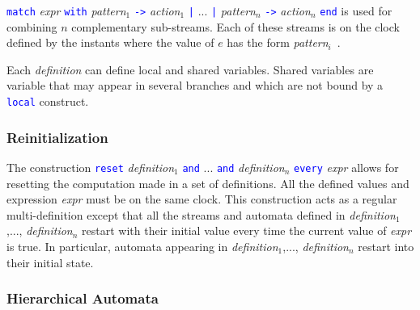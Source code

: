 \documentclass[11pt,titlepage,twoside]{report}
\newcommand{\And}{\mbox{{\tt and}}}
\renewcommand{\Reset}{\mbox{{\tt reset}}}
\newcommand{\Every}{\mbox{{\tt every}}}
\newcommand{\term}[1]{\textcolor{Blue}{\tt #1}}
\newcommand{\nterm}[1]{\textcolor{BrickRed}{\it #1}}
\newcommand{\term}[1]{{\tt #1}}
\newcommand{\nterm}[1]{{\em #1}}
\begin{document}
\term{match} \nterm{expr} \term{with} \nterm{pattern}$_1$ \term{->}
\nterm{action}$_1$ \term{|} ... \term{|} \nterm{pattern}$_n$ \term{->}
\nterm{action}$_n$ \term{end} is used for combining $n$ complementary
sub-streams. Each of these streams is on the clock defined by the
instants where the value of $e$ has the form \nterm{pattern}$_i$\ .

Each \nterm{definition} can define local and shared variables.
Shared variables are variable that may appear in several branches and
which are not bound by a \term{local} construct.

\subsubsection{Reinitialization}

The construction \term{\Reset} \nterm{definition}$_1$ \term{\And} ...
\term{\And} \nterm{definition}$_n$ \term{\Every} \nterm{expr} allows
for resetting the computation made in a set of definitions. All the
defined values and expression \nterm{expr} must be on the same
clock. This construction acts as a regular multi-definition except
that all the streams and automata defined in
\nterm{definition}$_1$,..., \nterm{definition}$_n$ restart with their
initial value every time the current value of {\em expr} is true. In
particular, automata appearing in \nterm{definition}$_1$,...,
\nterm{definition}$_n$ restart into their initial state.

\subsubsection{Hierarchical Automata}
\end{document}
